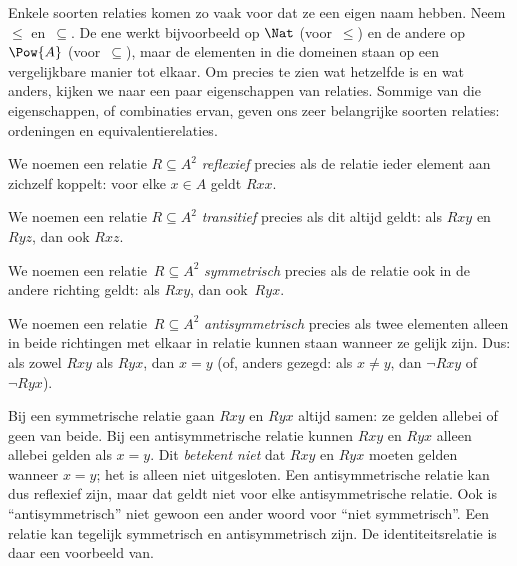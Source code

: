 \documentclass[openany]{memoir}
\begin{document}

\begin{intro}
Enkele soorten relaties komen zo vaak voor dat ze een eigen naam
hebben. Neem $\le$ en~$\subseteq$. De ene werkt bijvoorbeeld op $\Nat$
(voor~$\le$) en de andere op $\Pow{A}$ (voor~$\subseteq$), maar de
elementen in die domeinen staan op een vergelijkbare manier tot elkaar.
Om precies te zien wat hetzelfde is en wat anders, kijken we naar een
paar eigenschappen van relaties.
Sommige van die eigenschappen, of combinaties ervan, geven ons zeer
belangrijke soorten relaties: ordeningen en equivalentierelaties.
\end{intro}

\begin{defn}[Reflexiviteit]
We noemen een relatie $R \subseteq A^2$ \emph{reflexief} precies als
de relatie ieder element aan zichzelf koppelt: voor elke
$x \in A$ geldt $Rxx$.
\end{defn}

\begin{defn}[Transitiviteit]
We noemen een relatie $R \subseteq A^2$ \emph{transitief} precies als
dit altijd geldt: als $Rxy$ en $Ryz$, dan ook $Rxz$.
\end{defn}

\begin{defn}[Symmetrie]
We noemen een relatie~$R \subseteq A^2$ \emph{symmetrisch} precies als
de relatie ook in de andere richting geldt: als $Rxy$, dan ook~$Ryx$.
\end{defn}

\begin{defn}[Antisymmetrie]
We noemen een relatie~$R \subseteq A^2$ \emph{an\-ti\-symmetrisch}
precies als twee elementen alleen in beide richtingen met elkaar in
relatie kunnen staan wanneer ze gelijk zijn. Dus: als zowel $Rxy$ als
$Ryx$, dan $x=y$ (of, anders gezegd: als $x\neq y$, dan $\lnot Rxy$ of
$\lnot Ryx$).
\end{defn}

\begin{explain}
Bij een symmetrische relatie gaan $Rxy$ en $Ryx$ altijd samen: ze
gelden allebei of geen van beide. Bij een antisymmetrische relatie
kunnen $Rxy$ en $Ryx$ alleen allebei gelden als $x = y$. Dit \emph{betekent niet}
dat $Rxy$ en $Ryx$ moeten gelden wanneer $x = y$; het is alleen niet
uitgesloten. Een antisymmetrische relatie kan dus reflexief zijn, maar
dat geldt niet voor elke antisymmetrische relatie. Ook is
``antisymmetrisch'' niet gewoon een ander woord voor ``niet
symmetrisch''. Een relatie kan tegelijk symmetrisch en
antisymmetrisch zijn. De identiteitsrelatie is daar een voorbeeld van.
\end{explain}
\end{document}
